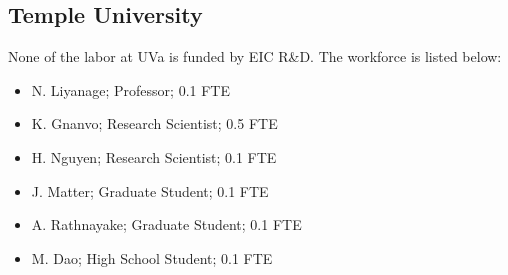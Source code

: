 \subsection{Temple University} 
None of the labor at UVa is funded by EIC R\&D. The workforce is listed below:
\begin{itemize}
\item N. Liyanage; Professor; 0.1 FTE
\item K. Gnanvo; Research Scientist; 0.5 FTE
\item H. Nguyen; Research Scientist; 0.1 FTE
\item J. Matter; Graduate Student;   0.1 FTE
\item A. Rathnayake; Graduate Student; 0.1 FTE
\item M. Dao; High School Student;   0.1 FTE
\end{itemize}